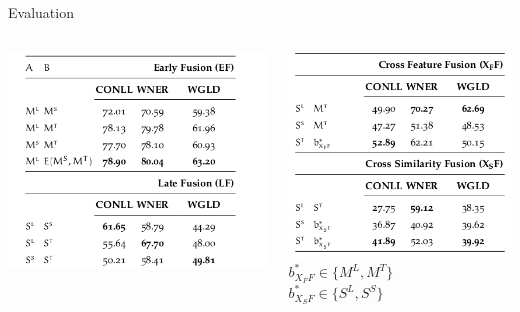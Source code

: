 \documentclass[10pt,=table]{beamer}
\newcommand\mlex{M^{\scriptscriptstyle L}}
\newcommand\mstd{M^{\scriptscriptstyle T}}
\newcommand\slex{S^{\scriptscriptstyle L}}
\newcommand\ssyn{S^{\scriptscriptstyle S}}
\begin{document}
\begin{frame}[t]{Evaluation}
\begin{columns}
	\begin{minipage}[c][.8\textheight][c]{\linewidth}
	
	\includegraphics[width=1\linewidth]{image2/Chapitre4/1F_1.png}
	
	\end{minipage}
	\begin{minipage}[c][0.8\textheight][c]{\linewidth}
	\includegraphics[width=1\linewidth]{image2/Chapitre4/1f_2.png}
	\\
	$b^*_{X_FF} \in \{\mlex, \mstd\}$
	\\
	$b^*_{X_SF} \in \{\slex, \ssyn\}$
	\end{minipage}
	\end{columns}
\end{frame}
\end{document}
